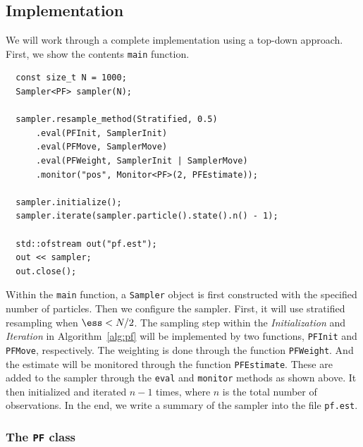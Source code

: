 \subsection{Implementation}
\label{sub:Implementation (PF)}

We will work through a complete implementation using a top-down approach.
First, we show the contents \verb|main| function.
\begin{Verbatim}
  const size_t N = 1000;
  Sampler<PF> sampler(N);

  sampler.resample_method(Stratified, 0.5)
      .eval(PFInit, SamplerInit)
      .eval(PFMove, SamplerMove)
      .eval(PFWeight, SamplerInit | SamplerMove)
      .monitor("pos", Monitor<PF>(2, PFEstimate));

  sampler.initialize();
  sampler.iterate(sampler.particle().state().n() - 1);

  std::ofstream out("pf.est");
  out << sampler;
  out.close();
\end{Verbatim}
Within the \verb|main| function, a \verb|Sampler| object is first constructed
with the specified number of particles. Then we configure the sampler. First,
it will use stratified resampling when $\ess < N / 2$. The sampling step within
the \emph{Initialization} and \emph{Iteration} in Algorithm~\ref{alg:pf} will
be implemented by two functions, \verb|PFInit| and \verb|PFMove|, respectively.
The weighting is done through the function \verb|PFWeight|. And the estimate
will be monitored through the function \verb|PFEstimate|. These are added to
the sampler through the \verb|eval| and \verb|monitor| methods as shown above.
It then initialized and iterated $n - 1$ times, where $n$ is the total number
of observations. In the end, we write a summary of the sampler into the file
\verb|pf.est|.

\subsubsection{The \texttt{PF} class}

